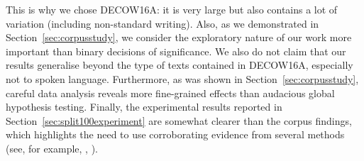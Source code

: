 This is why we chose DECOW16A: it is very large but also contains a lot of variation (including non-standard writing).
Also, as we demonstrated in Section~\ref{sec:corpusstudy}, we consider the exploratory nature of our work more important than binary decisions of significance.
We also do not claim that our results generalise beyond the type of texts contained in DECOW16A, especially not to spoken language.
Furthermore, as was shown in Section~\ref{sec:corpusstudy}, careful data analysis reveals more fine-grained effects than audacious global hypothesis testing.
Finally, the experimental results reported in Section~\ref{sec:split100experiment} are somewhat clearer than the corpus findings, which highlights the need to use corroborating evidence from several methods (see, for example, \citealt{ArppeJaervikivi2007}, \citealt{DivjakEa2016a}).
